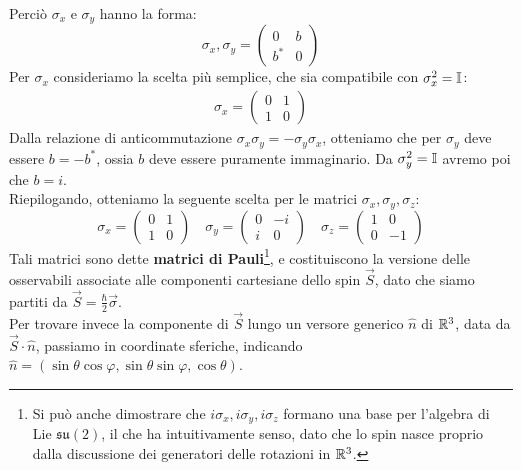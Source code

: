 \documentclass[../../FisicaTeorica.tex]{subfiles}
\begin{document}
Perciò $\sigma_x$ e $\sigma_y$ hanno la forma:
\[
\sigma_x, \sigma_y =
\begin{pmatrix}
0 & b\\
b^* & 0
\end{pmatrix}
\]
Per $\sigma_x$ consideriamo la scelta più semplice, che sia compatibile con $\sigma_x^2 = \mathbb{I}$:
\begin{align*}
\sigma_x = \begin{pmatrix}
0 & 1\\
1 & 0
\end{pmatrix}
\end{align*}
Dalla relazione di anticommutazione $\sigma_x\sigma_y = -\sigma_y\sigma_x$, otteniamo che per $\sigma_y$ deve essere $b=-b^*$, ossia $b$ deve essere puramente immaginario. Da $\sigma_y^2 = \mathbb{I}$ avremo poi che $b=i$.\\
Riepilogando, otteniamo la seguente scelta per le matrici $\sigma_x, \sigma_y, \sigma_z$:
\[
\sigma_x = \begin{pmatrix}
0 & 1\\
1 & 0
\end{pmatrix}
\quad
\sigma_y = \begin{pmatrix}
0 & -i\\
i & 0
\end{pmatrix} \quad
\sigma_z = \begin{pmatrix}
1 & 0\\
0 & -1
\end{pmatrix}
\]
Tali matrici sono dette \textbf{matrici di Pauli}\footnote{Si può anche dimostrare che $i\sigma_x, i\sigma_y, i\sigma_z$ formano una base per l'algebra di Lie $\mathfrak{su}(2)$, il che ha intuitivamente senso, dato che lo spin nasce proprio dalla discussione dei generatori delle rotazioni in $\mathbb{R}^3$.}, e costituiscono la versione  delle osservabili associate alle componenti cartesiane dello spin $\vec{S}$, dato che siamo partiti da $\vec{S}=\frac{\hbar}{2}\vec{\sigma}$.\\
Per trovare invece la componente di $\vec{S}$ lungo un versore generico $\hat{n}$ di $\mathbb{R}^3$, data da $\vec{S}\cdot \hat{n}$, passiamo in coordinate sferiche, indicando $\hat{n} = (\sin\theta\cos\varphi, \sin\theta\sin\varphi,\cos\theta)$.
\end{document}
